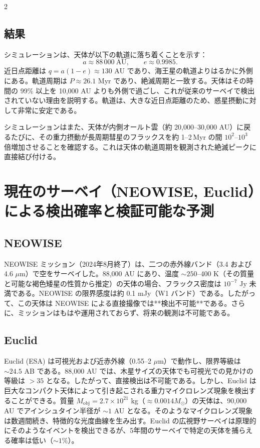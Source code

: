 \documentclass[12pt,a4paper]{article}
\begin{document}
\begin{multicols}{2}
		\subsection{結果}
		シミュレーションは、天体が以下の軌道に落ち着くことを示す：
		\[
		a \approx 88\,000\ \text{AU},\qquad e \approx 0.9985.
		\]
		近日点距離は \(q = a(1-e) \approx 130\) AU であり、海王星の軌道よりはるかに外側にある。軌道周期は \(P \approx 26.1\) Myr であり、絶滅周期と一致する。天体はその時間の 99\% 以上を 10,000 AU よりも外側で過ごし、これが従来のサーベイで検出されていない理由を説明する。軌道は、大きな近日点距離のため、惑星摂動に対して非常に安定である。
		
		シミュレーションはまた、天体が内側オールト雲（約 20,000–30,000 AU）に戻るたびに、その重力摂動が長周期彗星のフラックスを約 1–2 Myr の間 \(10^2\)–\(10^3\) 倍増加させることを確認する。これは天体の軌道周期を観測された絶滅ピークに直接結び付ける。
		
		\section{現在のサーベイ（NEOWISE, Euclid）による検出確率と検証可能な予測}
		\subsection{NEOWISE}
		NEOWISE ミッション（2024年8月終了）は、二つの赤外線バンド（3.4 および 4.6 \(\mu\)m）で空をサーベイした。88,000 AU にあり、温度 \(\sim 250\)–400 K（その質量と可能な褐色矮星の性質から推定）の天体の場合、フラックス密度は \(10^{-7}\) Jy 未満である。NEOWISE の限界感度は約 0.1 mJy（W1 バンド）である。したがって、この天体は NEOWISE による直接撮像では**検出不可能**である。さらに、ミッションはもはや運用されておらず、将来の観測は不可能である。
		
		\subsection{Euclid}
		Euclid (ESA) は可視光および近赤外線（0.55–2 \(\mu\)m）で動作し、限界等級は \(\sim 24.5\) AB である。88,000 AU では、木星サイズの天体でも可視光での見かけの等級は \(>35\) となる。したがって、直接検出は不可能である。しかし、Euclid は巨大なコンパクト天体によって引き起こされる重力マイクロレンズ現象を検出することができる。質量 \(M_{\text{obj}} = 2.7\times10^{21}\) kg（\(\approx 0.0014 M_{\odot}\)）の天体は、90,000 AU でアインシュタイン半径が \(\sim 1\) AU となる。そのようなマイクロレンズ現象は数週間続き、特徴的な光度曲線を生み出す。Euclid の広視野サーベイは原理的にそのようなイベントを検出できるが、5年間のサーベイで特定の天体を捕らえる確率は低い（\(\sim 1\%\)）。
		

\end{multicols}
\end{document}
